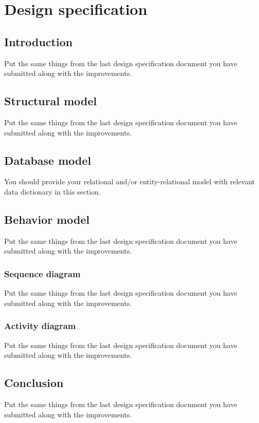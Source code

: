 \chapter{Design specification} %
\label{cha:design}

\section{Introduction} %
Put the same things from the last design specification document you have submitted along with the improvements.

\section{Structural model} %
\label{sec:structural_model}
Put the same things from the last design specification document you have submitted along with the improvements.

\section{Database model} %
\label{sec:database_model}
You should provide your relational and/or entity-relational model with relevant data dictionary in this section.

\section{Behavior model} %
\label{sec:behavior_model}
Put the same things from the last design specification document you have submitted along with the improvements.

\subsection{Sequence diagram} %
\label{sub:sequence_diagram}
Put the same things from the last design specification document you have submitted along with the improvements.

\subsection{Activity diagram} %
\label{sub:activity_diagram}
Put the same things from the last design specification document you have submitted along with the improvements.

\section{Conclusion} %
Put the same things from the last design specification document you have submitted along with the improvements.
